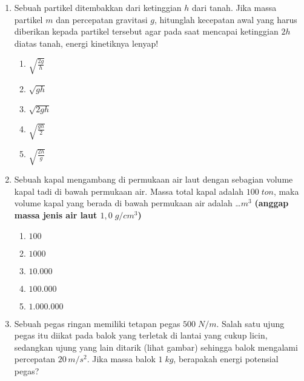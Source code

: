 \documentclass[A4,12PT, english, twocolumn]{journal}
\begin{document}
\begin{enumerate}
\item Sebuah partikel ditembakkan dari ketinggian $h$ dari tanah. Jika massa partikel $m$ dan percepatan gravitasi $g$, hitunglah kecepatan awal yang harus diberikan kepada partikel tersebut agar pada saat mencapai ketinggian $2h$ diatas tanah, energi kinetiknya lenyap!
    \begin{enumerate}
        \item $\sqrt{\frac{2g}{h}}$
        \item $\sqrt{gh}$
        \item $\sqrt{2gh}$
        \item $\sqrt{\frac{gh}{2}}$
        \item $\sqrt{\frac{2h}{g}}$
    \end{enumerate}
     
\item Sebuah kapal mengambang di permukaan air laut dengan sebagian volume kapal tadi di bawah permukaan air. Massa total kapal adalah $100 \; ton$, maka volume kapal yang berada di bawah permukaan air adalah \dots $m^3$
\textbf{(anggap massa jenis air laut $1,0 \; g/cm^3$)}
    \begin{enumerate}
        \item $100$
        \item $1000$
        \item $10.000$
        \item $100.000$
        \item $1.000.000$
    \end{enumerate}
   
\item Sebuah pegas ringan memiliki tetapan pegas $500 \; N/m$. Salah satu ujung pegas itu diikat pada balok yang terletak di lantai yang cukup licin, sedangkan ujung yang lain ditarik (lihat gambar) sehingga balok mengalami percepatan $20 \, m/s^2$. Jika massa balok $1 \; kg$, berapakah energi potensial pegas? 
\begin{center}
\end{center}
\end{enumerate}
\end{document}

